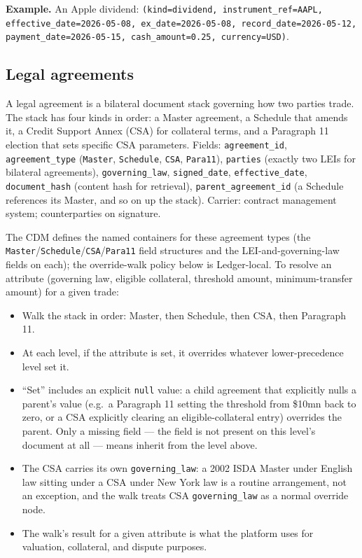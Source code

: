 \documentclass[11pt,a4paper]{article}
\begin{document}
\textbf{Example.} An Apple dividend: \texttt{(kind=dividend, instrument\_ref=AAPL, effective\_date=2026-05-08, ex\_date=2026-05-08, record\_date=2026-05-12, payment\_date=2026-05-15, cash\_amount=0.25, currency=USD)}.

\subsection{Legal agreements}

A legal agreement is a bilateral document stack governing how two parties trade. The stack has four kinds in order: a Master agreement, a Schedule that amends it, a Credit Support Annex (CSA) for collateral terms, and a Paragraph 11 election that sets specific CSA parameters. Fields: \texttt{agreement\_id}, \texttt{agreement\_type} (\texttt{Master}, \texttt{Schedule}, \texttt{CSA}, \texttt{Para11}), \texttt{parties} (exactly two LEIs for bilateral agreements), \texttt{governing\_law}, \texttt{signed\_date}, \texttt{effective\_date}, \texttt{document\_hash} (content hash for retrieval), \texttt{parent\_agreement\_id} (a Schedule references its Master, and so on up the stack). Carrier: contract management system; counterparties on signature.

The CDM defines the named containers for these agreement types (the \texttt{Master}/\texttt{Schedule}/\texttt{CSA}/\texttt{Para11} field structures and the LEI-and-governing-law fields on each); the override-walk policy below is Ledger-local. To resolve an attribute (governing law, eligible collateral, threshold amount, minimum-transfer amount) for a given trade:

\begin{itemize}
\item Walk the stack in order: Master, then Schedule, then CSA, then Paragraph 11.
\item At each level, if the attribute is set, it overrides whatever lower-precedence level set it.
\item ``Set'' includes an explicit \texttt{null} value: a child agreement that explicitly nulls a parent's value (e.g.\ a Paragraph 11 setting the threshold from \$10mn back to zero, or a CSA explicitly clearing an eligible-collateral entry) overrides the parent. Only a missing field --- the field is not present on this level's document at all --- means inherit from the level above.
\item The CSA carries its own \texttt{governing\_law}: a 2002 ISDA Master under English law sitting under a CSA under New York law is a routine arrangement, not an exception, and the walk treats CSA \texttt{governing\_law} as a normal override node.
\item The walk's result for a given attribute is what the platform uses for valuation, collateral, and dispute purposes.
\end{itemize}
\end{document}
